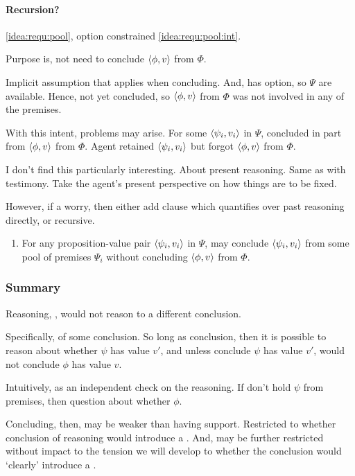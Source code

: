 \paragraph{Recursion?}

\begin{note}
  \ref{idea:requ:pool}, option constrained \ref{idea:requ:pool:int}.

  Purpose is, not need to conclude \(\langle \phi, v \rangle\) from \(\Phi\).

  Implicit assumption that \requ{} applies when concluding.
  And, has option, so \(\Psi\) are available.
  Hence, not yet concluded, so \(\langle \phi, v \rangle\) from \(\Phi\) was not involved in any of the premises.

  With this intent, problems may arise.
  For some \(\langle \psi_{i}, v_{i} \rangle\) in \(\Psi\), concluded in part from \(\langle \phi, v \rangle\) from \(\Phi\).
  Agent retained \(\langle \psi_{i}, v_{i} \rangle\) but forgot \(\langle \phi, v \rangle\) from \(\Phi\).

  I don't find this particularly interesting.
  About present reasoning.
  Same as with testimony.
  Take the agent's present perspective on how things are to be fixed.

  However, if a worry, then either add clause which quantifies over past reasoning directly, or recursive.

  \begin{enumerate}
  \item
    \label{idea:requ:pool:ind}
    For any proposition-value pair \(\langle \psi_{i}, v_{i} \rangle\) in \(\Psi\), \vAgent{} may conclude \(\langle \psi_{i}, v_{i} \rangle\) from some pool of premises \(\Psi_{i}\) without concluding \(\langle \phi, v \rangle\) from \(\Phi\).
  \end{enumerate}
\end{note}


\subsubsection{Summary}

\begin{note}
  Reasoning, \support{}, would not reason to a different conclusion.

  Specifically, \requ{} of some conclusion.
  So long as conclusion, then it is possible to reason about whether \(\psi\) has value \(v'\), and unless conclude \(\psi\) has value \(v'\), would not conclude \(\phi\) has value \(v\).

  Intuitively, \requ{} as an independent check on the reasoning.
  If don't hold \(\psi\) from premises, then question about whether \(\phi\).

  Concluding, then, may be weaker than having support.
  Restricted to whether conclusion of reasoning would introduce a \requ{}.
  And, may be further restricted without impact to the tension we will develop to whether the conclusion would `clearly' introduce a \requ{}.
\end{note}

